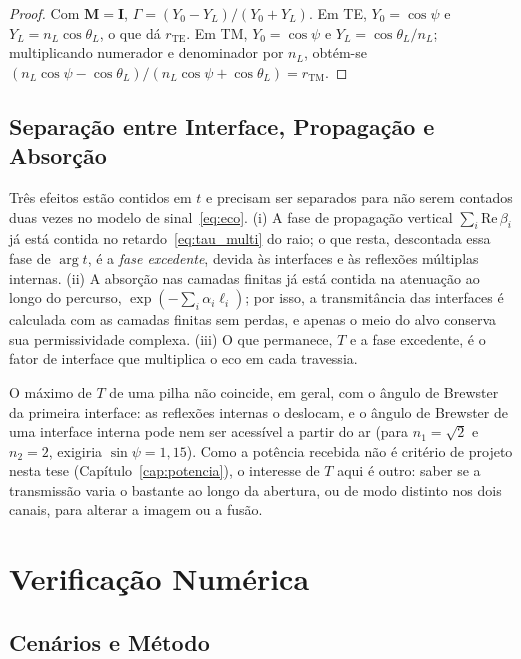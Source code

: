 \documentclass[12pt,a4paper,oneside]{book}
\theoremstyle{remark}
\theoremstyle{plain}
\theoremstyle{definition}
\begin{document}
\begin{proof}
Com $\mathbf M=\mathbf I$, $\Gamma=(Y_0-Y_L)/(Y_0+Y_L)$. Em TE,
$Y_0=\cos\psi$ e $Y_L=n_L\cos\theta_L$, o que dá $r_{\text{TE}}$. Em TM,
$Y_0=\cos\psi$ e $Y_L=\cos\theta_L/n_L$; multiplicando numerador e denominador
por $n_L$, obtém-se $(n_L\cos\psi-\cos\theta_L)/(n_L\cos\psi+\cos\theta_L)=r_{\text{TM}}$.
\end{proof}

\subsection{Separação entre Interface, Propagação e Absorção}

Três efeitos estão contidos em $t$ e precisam ser separados para não serem
contados duas vezes no modelo de sinal~\eqref{eq:eco}. (i) A fase de propagação
vertical $\sum_i\mathrm{Re}\,\beta_i$ já está contida no
retardo~\eqref{eq:tau_multi} do raio; o que resta, descontada essa fase de
$\arg t$, é a \emph{fase excedente}, devida às interfaces e às reflexões múltiplas
internas. (ii) A absorção nas camadas finitas já está contida na atenuação ao
longo do percurso, $\exp(-\sum_i\alpha_i\ell_i)$; por isso, a transmitância das
interfaces é calculada com as camadas finitas sem perdas, e apenas o meio do alvo
conserva sua permissividade complexa. (iii) O que permanece, $T$ e a fase
excedente, é o fator de interface que multiplica o eco em cada travessia.

O máximo de $T$ de uma pilha não coincide, em geral, com o ângulo de Brewster da
primeira interface: as reflexões internas o deslocam, e o ângulo de Brewster de
uma interface interna pode nem ser acessível a partir do ar (para $n_1=\sqrt2$ e
$n_2=2$, exigiria $\sin\psi=1,15$). Como a potência recebida não é critério de
projeto nesta tese (Capítulo~\ref{cap:potencia}), o interesse de $T$ aqui é outro:
saber se a transmissão varia o bastante ao longo da abertura, ou de modo
distinto nos dois canais, para alterar a imagem ou a fusão.

\section{Verificação Numérica}
\label{sec:multi_sim}

\subsection{Cenários e Método}
\end{document}
